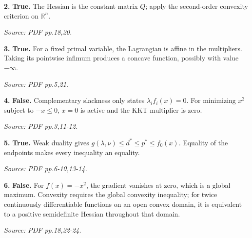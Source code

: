 \documentclass[11pt,a4paper]{article}
\begin{document}
\par\noindent\begin{minipage}{\linewidth}
\textbf{2.} \textbf{True.} The Hessian is the constant matrix \(Q\); apply the second-order convexity criterion on \(\mathbb R^n\).

{\footnotesize\textit{Source: PDF pp.18,20.}}
\end{minipage}\par\vspace{3mm}
\par\noindent\begin{minipage}{\linewidth}
\textbf{3.} \textbf{True.} For a fixed primal variable, the Lagrangian is affine in the multipliers. Taking its pointwise infimum produces a concave function, possibly with value \(-\infty\).

{\footnotesize\textit{Source: PDF pp.5,21.}}
\end{minipage}\par\vspace{3mm}
\par\noindent\begin{minipage}{\linewidth}
\textbf{4.} \textbf{False.} Complementary slackness only states \(\lambda_if_i(x)=0\). For minimizing \(x^2\) subject to \(-x\le0\), \(x=0\) is active and the KKT multiplier is zero.

{\footnotesize\textit{Source: PDF pp.3,11-12.}}
\end{minipage}\par\vspace{3mm}
\par\noindent\begin{minipage}{\linewidth}
\textbf{5.} \textbf{True.} Weak duality gives \(g(\lambda,\nu)\le d^*\le p^*\le f_0(x)\). Equality of the endpoints makes every inequality an equality.

{\footnotesize\textit{Source: PDF pp.6-10,13-14.}}
\end{minipage}\par\vspace{3mm}
\par\noindent\begin{minipage}{\linewidth}
\textbf{6.} \textbf{False.} For \(f(x)=-x^2\), the gradient vanishes at zero, which is a global maximum. Convexity requires the global convexity inequality; for twice continuously differentiable functions on an open convex domain, it is equivalent to a positive semidefinite Hessian throughout that domain.

{\footnotesize\textit{Source: PDF pp.18,22-24.}}
\end{minipage}\par\vspace{3mm}
\end{document}
